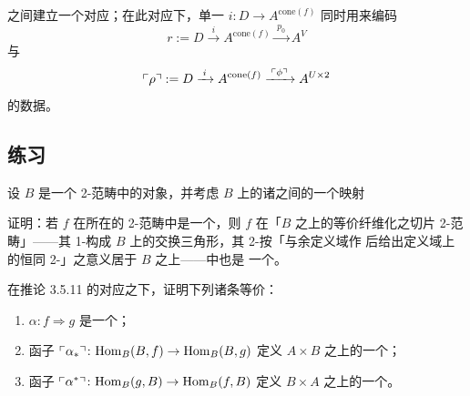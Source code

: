 \begin{example}
\begin{center}
\end{center}
之间建立一个对应；在此对应下，单一\trFunctor{} $i\colon D\to A^{\mathrm{cone}(f)}$ 同时用来编码 %
\trFunctor
\[
r:=D\xrightarrow{\;i\;}A^{\mathrm{cone}(f)}\xrightarrow{\;p_{0}\;}A^{V}
\]
与\trNaturalTransformation
\[
\ulcorner\rho\urcorner:=D\xrightarrow{\;i\;}A^{\mathrm{cone}(f)}\xrightarrow{\;\ulcorner\phi\urcorner\;}A^{U\times 2}
\]
的数据。
\end{example}

\subsection*{练习}

\begin{exercise}\label{ex:ambient-equivalence}
设 $B$ 是一个 2-范畴中的对象，并考虑 $B$ 上的诸\trIsofibration{}之间的一个映射
\begin{center}
\end{center}
证明：若 $f$ 在所在的 2-范畴中是一个\trEquivalence，则 $f$ 在「$B$ 之上的等价纤维化之切片 %
2-范畴」——其 1-\trCell{}构成 $B$ 上的交换三角形，其 2-\trCell{}按「与余定义域\trIsofibration{}作%
\trWhiskering{}后给出定义域\trIsofibration{}上的恒同 2-\trCell」之意义居于 $B$ 之上——中也是 %
一个\trEquivalence。
\end{exercise}

\begin{exercise}\label{ex:cheap-yoneda-fibered-equivalence}
在推论 3.5.11 的对应之下，证明下列诸条等价：
\begin{enumerate}[label=(\roman*)]
\item $\alpha\colon f\Rightarrow g$ 是一个\trIsomorphism；
\item 函子 $\ulcorner\alpha_{*}\urcorner\colon\mathrm{Hom}_{B}(B,f)\to\mathrm{Hom}_{B}(B,g)$ 定义 %
$A\times B$ 之上的一个\trFiberedEquivalence；
\item 函子 $\ulcorner\alpha^{*}\urcorner\colon\mathrm{Hom}_{B}(g,B)\to\mathrm{Hom}_{B}(f,B)$ 定义 %
$B\times A$ 之上的一个\trFiberedEquivalence。
\end{enumerate}
\end{exercise}

